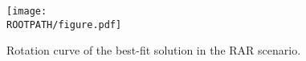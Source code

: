 \begin{figure}%
	\centering%
	\texttt{[image: \\ROOTPATH/figure.pdf]}
	\caption{Rotation curve of the best-fit solution in the RAR scenario.}%
	\label{fig:rar:vrot}%
\end{figure}
